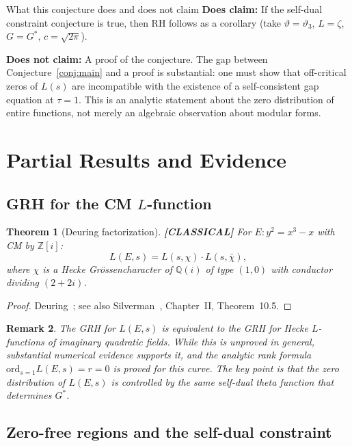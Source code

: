 \documentclass[11pt]{article}
\theoremstyle{tight}
\newtheorem{theorem}{Theorem}[section]
\theoremstyle{plainroman}
\newtheorem{remark}[theorem]{Remark}
\newcommand{\Z}{\mathbb{Z}}
\newcommand{\Q}{\mathbb{Q}}
\begin{document}
\begin{cautionbox}{What this conjecture does and does not claim}
\textbf{Does claim:} If the self-dual constraint conjecture is true, then RH follows as a corollary (take $\vartheta=\vartheta_3$, $L=\zeta$, $G=G^*$, $c=\sqrt{2\pi}$).

\textbf{Does not claim:} A proof of the conjecture.
The gap between Conjecture~\ref{conj:main} and a proof is substantial: one must show that off-critical zeros of $L(s)$ are incompatible with the existence of a self-consistent gap equation at $\tau=1$.
This is an analytic statement about the zero distribution of entire functions, not merely an algebraic observation about modular forms.
\end{cautionbox}

\section{Partial Results and Evidence}

\subsection{GRH for the CM $L$-function}

\begin{theorem}[Deuring factorization]\label{thm:deuring}
\textbf{[CLASSICAL]}
For $E:y^2=x^3-x$ with CM by $\Z[i]$:
\[
L(E,s)=L(s,\chi)\cdot L(s,\bar\chi),
\]
where $\chi$ is a Hecke Gr\"ossencharacter of $\Q(i)$ of type $(1,0)$ with conductor dividing $(2+2i)$.
\end{theorem}
\begin{proof}
Deuring~\cite{deuring}; see also Silverman~\cite{silverman}, Chapter~II, Theorem~10.5.
\end{proof}

\begin{remark}
The GRH for $L(E,s)$ is equivalent to the GRH for Hecke $L$-functions of imaginary quadratic fields.
While this is unproved in general, substantial numerical evidence supports it, and the analytic rank formula $\mathrm{ord}_{s=1}L(E,s)=r=0$ is proved for this curve.
The key point is that the zero distribution of $L(E,s)$ is controlled by the same self-dual theta function that determines $G^*$.
\end{remark}

\subsection{Zero-free regions and the self-dual constraint}
\end{document}
